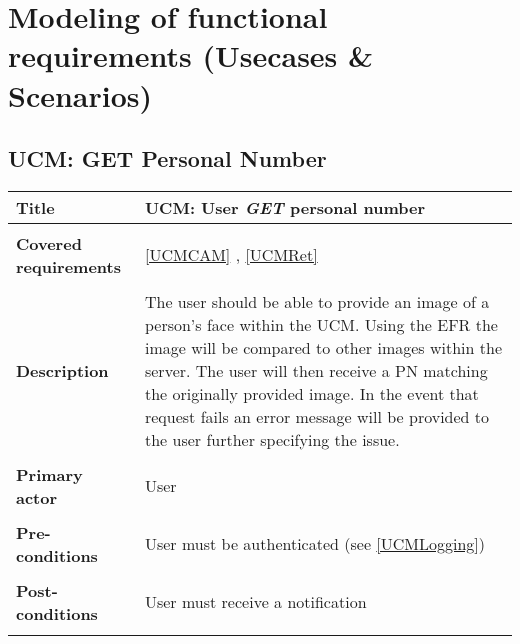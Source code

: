 \documentclass[a4paper,11pt]{article}
\begin{document}
\newpage
\section{Modeling of functional requirements (Usecases \& Scenarios)}


\subsection{UCM: GET Personal Number}

\begin{tabular}{|p{3.5cm}|p{11.5cm}|} \hline
    \textbf{Title} &   UCM: User \emph{GET} personal number 
        
    \\ \hline \rowcolor{Gray} & \\ \hline
        
            \textbf{Covered requirements} &  \ref{UCMCAM} , \ref{UCMRet}
        
    \\ \hline \rowcolor{Gray} & \\ \hline
        
        
    \textbf{Description} &  The user should be able to provide an image of a person's face within the UCM. Using the EFR the image will be compared to other images within the server. The user will then receive a PN matching the originally provided image. In the event that request fails an error message will be provided to the user further specifying the issue.
        
    \\ \hline \rowcolor{Gray} & \\ \hline
        
    \textbf{Primary actor} & User  
        
    \\ \hline \rowcolor{Gray} & \\ \hline 
          
    \textbf{Pre-conditions} &   User must be authenticated (see \ref{UCMLogging})
        
    \\ \hline \rowcolor{Gray} & \\ \hline
         
    \textbf{Post-conditions} &   User must receive a notification
        
    \\ \hline \rowcolor{Gray} & \\ \hline 
         

\end{tabular}
\end{document}
